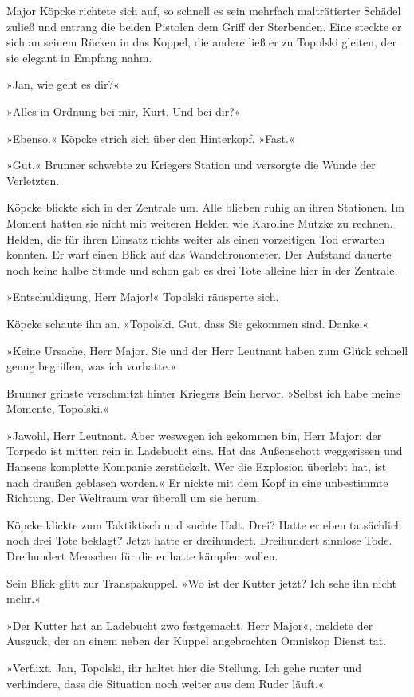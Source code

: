 Major Köpcke richtete sich auf, so schnell es sein mehrfach
malträtierter Schädel zuließ und entrang die beiden Pistolen dem
Griff der Sterbenden. Eine steckte er sich an seinem Rücken in das
Koppel, die andere ließ er zu Topolski gleiten, der sie elegant in
Empfang nahm.

»Jan, wie geht es dir?«

»Alles in Ordnung bei mir, Kurt. Und bei dir?«

»Ebenso.« Köpcke strich sich über den Hinterkopf. »Fast.«

»Gut.« Brunner schwebte zu Kriegers Station und versorgte die Wunde
der Verletzten.

Köpcke blickte sich in der Zentrale um. Alle blieben ruhig an ihren
Stationen. Im Moment hatten sie nicht mit weiteren Helden wie
Karoline Mutzke zu rechnen. Helden, die für ihren Einsatz nichts
weiter als einen vorzeitigen Tod erwarten konnten. Er warf einen
Blick auf das Wandchronometer. Der Aufstand dauerte noch keine
halbe Stunde und schon gab es drei Tote alleine hier in der
Zentrale.

»Entschuldigung, Herr Major!« Topolski räusperte sich.

Köpcke schaute ihn an. »Topolski. Gut, dass Sie gekommen sind.
Danke.«

»Keine Ursache, Herr Major. Sie und der Herr Leutnant haben zum
Glück schnell genug begriffen, was ich vorhatte.«

Brunner grinste verschmitzt hinter Kriegers Bein hervor. »Selbst
ich habe meine Momente, Topolski.«

»Jawohl, Herr Leutnant. Aber weswegen ich gekommen bin, Herr Major:
der Torpedo ist mitten rein in Ladebucht eins. Hat das Außenschott
weggerissen und Hansens komplette Kompanie zerstückelt. Wer die
Explosion überlebt hat, ist nach draußen geblasen worden.« Er
nickte mit dem Kopf in eine unbestimmte Richtung. Der Weltraum war
überall um sie herum.

Köpcke klickte zum Taktiktisch und suchte Halt. Drei? Hatte er eben
tatsächlich noch drei Tote beklagt? Jetzt hatte er dreihundert.
Dreihundert sinnlose Tode. Dreihundert Menschen für die er hatte
kämpfen wollen.

Sein Blick glitt zur Transpakuppel. »Wo ist der Kutter jetzt? Ich
sehe ihn nicht mehr.«

»Der Kutter hat an Ladebucht zwo festgemacht, Herr Major«, meldete
der Ausguck, der an einem neben der Kuppel angebrachten Omniskop
Dienst tat.

»Verflixt. Jan, Topolski, ihr haltet hier die Stellung. Ich gehe
runter und verhindere, dass die Situation noch weiter aus dem Ruder
läuft.«

